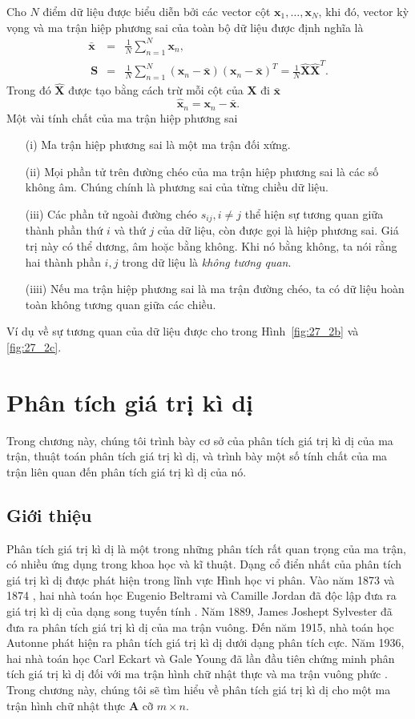 \documentclass[12pt,a4paper,oneside]{report}
\numberwithin{equation}{section}
\begin{document}
Cho $N$ điểm dữ liệu được biểu diễn bởi các vector cột $\mathbf{x}_1, \dots, \mathbf{x}_N$, khi đó, {vector kỳ vọng} và {ma trận hiệp phương sai} của toàn bộ dữ liệu được định nghĩa là
\begin{eqnarray} 
	\bar{\mathbf{x}} &=& \frac{1}{N} \sum_{n=1}^N \mathbf{x}_n, \\\ 
	\mathbf{S} &=&  \frac{1}{N}\sum_{n=1}^N (\mathbf{x}_n - \bar{\mathbf{x}})(\mathbf{x}_n - \bar{\mathbf{x}})^T = \frac{1}{N}\hat{\mathbf{X}}\hat{\mathbf{X}}^T.
\end{eqnarray} 
Trong đó $\hat{\mathbf{X}}$ được tạo bằng cách trừ mỗi cột của $\mathbf{X}$ đi $\bar{\mathbf{x}}$
\begin{equation} 
	\hat{\mathbf{x}}_n = \mathbf{x}_n - \bar{\mathbf{x}}.
\end{equation} 
Một vài tính chất của ma trận hiệp phương sai
\begin{itemize}
\item[(i)] Ma trận hiệp phương sai là một ma trận đối xứng.	
\item[(ii)] Mọi phần tử trên đường chéo của ma trận hiệp phương sai là các số không âm. Chúng chính là phương sai của từng chiều dữ liệu. 
\item[(iii)] Các phần tử ngoài đường chéo $s_{ij}, i \neq j$ thể hiện sự tương quan
	giữa thành phần thứ $i$ và thứ $j$ của dữ liệu, còn được gọi là hiệp phương
	sai. Giá trị này có thể dương, âm hoặc bằng không. Khi nó bằng không, ta nói
	rằng hai thành phần $i, j$ trong dữ liệu là \textit{không tương quan}.	
\item[(iiii)] Nếu ma trận hiệp phương sai là ma trận đường chéo, ta có dữ liệu hoàn toàn không tương quan giữa các chiều. 
\end{itemize}
Ví dụ về sự tương quan của dữ liệu được cho trong Hình~\ref{fig:27_2b} và
\ref{fig:27_2c}.%
\chapter{ Phân tích giá trị kì dị }
Trong chương này, chúng tôi trình bày cơ sở của phân tích giá trị kì dị của ma trận, thuật toán phân tích giá trị kì dị, và trình bày một số tính chất của ma trận liên quan đến phân tích giá trị kì dị của nó. 
\section{Giới thiệu}
Phân tích giá trị kì dị là một trong những phân tích rất quan trọng của ma trận, có nhiều ứng dụng trong khoa học và kĩ thuật. Dạng cổ điển nhất của phân tích giá trị kì dị được phát hiện trong lĩnh vực Hình học vi phân. Vào năm 1873 và 1874 , hai nhà toán học Eugenio Beltrami và Camille Jordan đã độc lập đưa ra giá trị kì dị của dạng song tuyến tính \cite{stewart1993}. Năm 1889, James Joshept Sylvester đã đưa ra phân tích giá trị kì dị của ma trận vuông. Đến năm 1915, nhà toán học Autonne phát hiện ra phân tích giá trị kì dị dưới dạng phân tích cực. Năm 1936, hai nhà toán học Carl Eckart và Gale Young đã lần đầu tiên chứng minh phân tích giá trị kì dị đối với ma trận hình chữ nhật thực và ma trận vuông phức \cite{eckart1936}. Trong chương này, chúng tôi sẽ tìm hiểu về phân tích giá trị kì dị cho một ma trận hình chữ nhật thực $\mathbf{A}$ cỡ $m \times n$.
\end{document}
